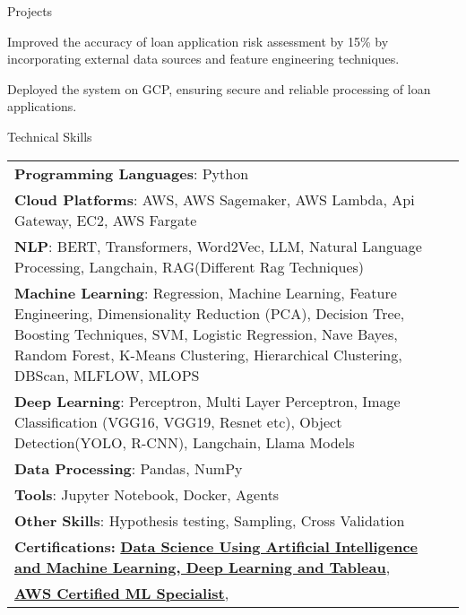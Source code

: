 \documentclass{resume} %
\begin{document}
\begin{rSection}{Projects}
\begin{rSubsection}
                                    \item Improved the accuracy of loan application risk assessment by 15\% by incorporating external data sources and feature engineering techniques.
                                    \item Deployed the system on GCP, ensuring secure and reliable processing of loan applications.
                            \end{rSubsection}
            \end{rSection}

    \begin{rSection}{Technical Skills}
        \begin{tabular}{ @{} l @{\hspace{1ex}} l }
                                \textbf{Programming Languages}: Python\\
                                \textbf{Cloud Platforms}: AWS, AWS Sagemaker, AWS Lambda, Api Gateway, EC2, AWS Fargate\\
                                \textbf{NLP}: BERT, Transformers, Word2Vec, LLM, Natural Language Processing, Langchain, RAG(Different Rag Techniques)\\
                                \textbf{Machine Learning}: Regression, Machine Learning, Feature Engineering, Dimensionality Reduction (PCA), Decision Tree, Boosting Techniques, SVM, Logistic Regression, Nave Bayes, Random Forest, K{-}Means Clustering, Hierarchical Clustering, DBScan, MLFLOW, MLOPS\\
                                \textbf{Deep Learning}: Perceptron, Multi Layer Perceptron, Image Classification (VGG16, VGG19, Resnet etc), Object Detection(YOLO, R{-}CNN), Langchain, Llama Models\\
                                \textbf{Data Processing}: Pandas, NumPy\\
                                \textbf{Tools}: Jupyter Notebook, Docker, Agents\\
                                \textbf{Other Skills}: Hypothesis testing, Sampling, Cross Validation\\
                        \textbf{Certifications:} 
                                            \href{None}{\textbf{Data Science Using Artificial Intelligence and Machine Learning, Deep Learning and Tableau}},\\
                                            \href{None}{\textbf{AWS Certified ML Specialist}},\\
                                 
        \end{tabular}
    \end{rSection}
 
\end{document}
